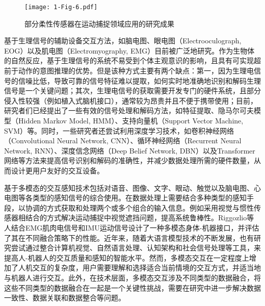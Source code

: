 \begin{figure}[htb]
  \centering
  \texttt{[image: 1-Fig-6.pdf]}
  \caption{部分柔性传感器在运动捕捉领域应用的研究成果}
  \label{fig:1-6}
\end{figure}

基于生理信号的辅助设备交互方法，如脑电图、眼电图（Electrooculograph, EOG）以及肌电图（Electromyography, EMG）目前被广泛地研究。作为生物体的自然反应，基于生理信号的系统不易受到个体主观意识的影响，且具有可实现超前于动作的意图推理的优势。但是该种方式主要有两个缺点：第一，因为生理电信号的信噪比低，导致可靠的信号特征难以提取，如何实时地准确地识别和解码生理信号是一个关键问题；其次，生理电信号的获取需要开发专门的硬件系统，且部分侵入性较强（例如植入式脑机接口），通常较为昂贵并且不便于携带使用\cite{blabeAssessmentBrainMachine2015a,collingerFunctionalPrioritiesAssistive2013a}；目前，研究者们已经提出了一些有效的信号处理和解码方法，如特征提取\cite{phinyomarkFeatureExtractionSelection2018}、隐马尔可夫模型（Hidden Markov Model, HMM）\cite{chaurasiyaSequentialStudyEmotions2019}、支持向量机（Support Vector Machine, SVM）\cite{richhariyaEEGSignalClassification2018}等。同时，一些研究者还尝试利用深度学习技术，如卷积神经网络（Convolutional Neural Network, CNN）\cite{briouzaConvolutionalNeuralNetworkBased2021}、循环神经网络（Recurrent Neural Network, RNN）\cite{suppiahFuzzyInferenceSystem2022}、深度信念网络（Deep Belief Network, DBN）\cite{zhengEEGbasedEmotionClassification2014}以及Transformer网络\cite{montazerinTransformerbasedHandGesture2023,wanEEGformerTransformerBased2023}等方法来提高信号识别和解码的准确性，并减少数据处理所需的硬件数量，从而设计更用户友好的交互设备。

基于多模态的交互感知技术包括对语音、图像、文字、眼动、触觉以及脑电图、心电图等各类型的感知信号的综合使用\cite{suRecentAdvancementsMultimodal2023}。在数据处理上需要结合多种类型的感知手段，以协调的方式获取和处理两个或多个组合的输入信息。例如采用视觉与惯性传感器相结合的方式解决运动捕捉中视觉遮挡问题\cite{mallesonRealTimeFullBodyMotion2017,moniruzzamanWearableMotionCapture2023}，提高系统鲁棒性。Riggozlio等人\cite{rizzoglioHybridBodyMachineInterface2020}结合EMG肌肉电信号和IMU运动信号设计了一种多模态身体-机器接口，并评估了其在不同融合策略下的性能。近年来，随着大语言模型技术的不断发展，也有研究尝试通过整合计算机视觉、自然语言处理、认知架构和社会信号处理等工具，来提高人-机器人的交互质量和感知的智能水平\cite{dongHuBoVLMUnifiedVisionLanguage2023,huangVoxPoserComposable3D2023,gaoPhysicallyGroundedVisionLanguage2023}。然而，多模态交互在一定程度上增加了人机交互的复杂度，用户需要理解和选择适合当前情境的交互方式，并适当地与机器人进行交互。此外，在技术层面，多模态交互涉及不同类型的数据融合，将这些不同类型的数据融合在一起是一个关键性挑战，需要在研究中进一步解决数据一致性、数据关联和数据整合等问题。

